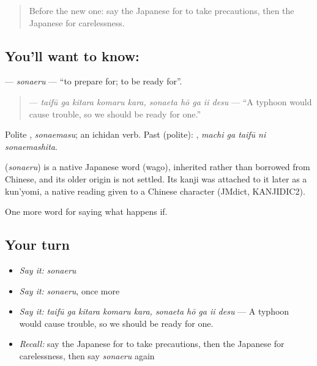 \label{lesson:JA-C350-sonaeru}



\begin{quote}
Before the new one: say the Japanese for to take precautions, then the Japanese for carelessness.
\end{quote}

\subsection*{You'll want to know: }
\textbf{} — \emph{sonaeru} — \textquotedblleft{}to prepare for; to be ready for\textquotedblright{}.

\begin{quote}
\textbf{    } — \emph{taifū ga kitara komaru kara, sonaeta hō ga ii desu} — \textquotedblleft{}A typhoon would cause trouble, so we should be ready for one.\textquotedblright{}
\end{quote}

Polite \textbf{}, \emph{sonaemasu}; an ichidan verb. Past (polite): \textbf{  }, \emph{machi ga taifū ni sonaemashita}.

\begin{cousinweb}
\textbf{} (\emph{sonaeru}) is a native Japanese word (wago), inherited rather than borrowed from Chinese, and its older origin is not settled. Its kanji was attached to it later as a kun'yomi, a native reading given to a Chinese character (JMdict, KANJIDIC2).
\end{cousinweb}

\begin{grammarlens}[title={What you've built}]
One more word for saying what happens if.
\end{grammarlens}

\subsection*{Your turn}
\begin{itemize}
\raggedright
  \item \emph{Say it:} \emph{sonaeru}
  \item \emph{Say it:} \emph{sonaeru}, once more
  \item \emph{Say it:} \emph{taifū ga kitara komaru kara, sonaeta hō ga ii desu} — A typhoon would cause trouble, so we should be ready for one.
  \item \emph{Recall:} say the Japanese for to take precautions, then the Japanese for carelessness, then say \emph{sonaeru} again
\end{itemize}

